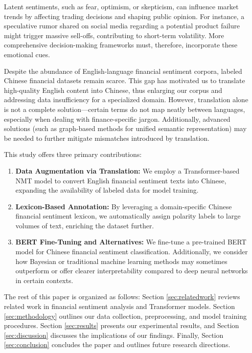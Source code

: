 \documentclass[12pt]{article}
\begin{document}
Latent sentiments, such as fear, optimism, or skepticism, can influence market trends by affecting trading decisions and shaping public opinion. For instance, a speculative rumor shared on social media regarding a potential product failure might trigger massive sell-offs, contributing to short-term volatility. More comprehensive decision-making frameworks must, therefore, incorporate these emotional cues.

Despite the abundance of English-language financial sentiment corpora, labeled Chinese financial datasets remain scarce. This gap has motivated us to translate high-quality English content into Chinese, thus enlarging our corpus and addressing data insufficiency for a specialized domain. However, translation alone is not a complete solution---certain terms do not map neatly between languages, especially when dealing with finance-specific jargon. Additionally, advanced solutions (such as graph-based methods for unified semantic representation) may be needed to further mitigate mismatches introduced by translation.

This study offers three primary contributions:

\begin{enumerate}
    \item \textbf{Data Augmentation via Translation:} We employ a Transformer-based NMT model to convert English financial sentiment texts into Chinese, expanding the availability of labeled data for model training.
    \item \textbf{Lexicon-Based Annotation:} By leveraging a domain-specific Chinese financial sentiment lexicon, we automatically assign polarity labels to large volumes of text, enriching the dataset further.
    \item \textbf{BERT Fine-Tuning and Alternatives:} We fine-tune a pre-trained BERT model for Chinese financial sentiment classification. Additionally, we consider how Bayesian or traditional machine learning methods may sometimes outperform or offer clearer interpretability compared to deep neural networks in certain contexts.
\end{enumerate}

The rest of this paper is organized as follows: Section \ref{sec:relatedwork} reviews related work in financial sentiment analysis and Transformer models. Section \ref{sec:methodology} outlines our data collection, preprocessing, and model training procedures. Section \ref{sec:results} presents our experimental results, and Section \ref{sec:discussion} discusses the implications of our findings. Finally, Section \ref{sec:conclusion} concludes the paper and outlines future research directions.
\end{document}
